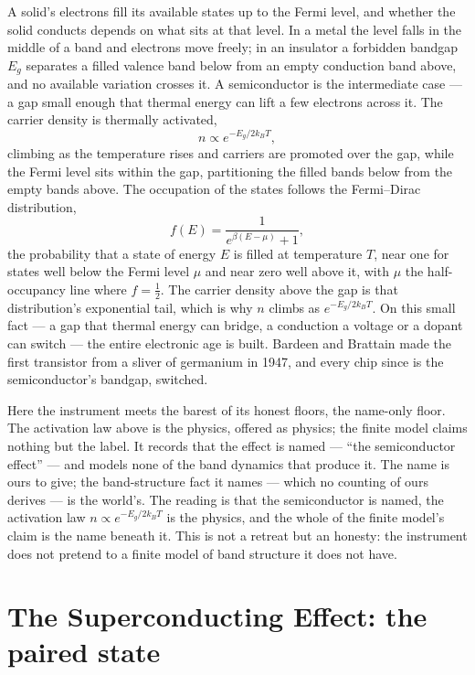 A solid's electrons fill its available states up to the Fermi level, and whether the solid conducts depends
on what sits at that level. In a metal the level falls in the middle of a band and electrons move freely; in
an insulator a forbidden bandgap $E_g$ separates a filled valence band below from an empty conduction band
above, and no available variation crosses it. A semiconductor is the intermediate case --- a gap small enough
that thermal energy can lift a few electrons across it. The carrier density is thermally activated,
\begin{equation}
  n \propto e^{-E_g/2k_B T},
\end{equation}
climbing as the temperature rises and carriers are promoted over the gap, while the Fermi level sits within
the gap, partitioning the filled bands below from the empty bands above. The occupation of the states follows
the Fermi--Dirac distribution,
\begin{equation}
  f(E) = \frac{1}{e^{\beta(E-\mu)} + 1},
\end{equation}
the probability that a state of energy $E$ is filled at temperature $T$, near one for states well below the
Fermi level $\mu$ and near zero well above it, with $\mu$ the half-occupancy line where $f = \tfrac12$. The
carrier density above the gap is that distribution's exponential tail, which is why $n$ climbs as $e^{-E_g/2k_B
T}$. On this small fact --- a gap that thermal energy can bridge, a conduction a voltage or a dopant can switch --- the entire electronic age is
built. Bardeen and Brattain made the first transistor from a sliver of germanium in 1947, and every chip since
is the semiconductor's bandgap, switched.

Here the instrument meets the barest of its honest floors, the name-only floor. The activation law above is
the physics, offered as physics; the finite model claims nothing but the label. It records that the effect is
named --- ``the semiconductor effect'' --- and models none of the band dynamics that produce it. The name is
ours to give; the band-structure fact it names --- which no counting of ours derives --- is the world's. The
reading is that the semiconductor is named, the activation law $n \propto e^{-E_g/2k_B T}$ is the physics, and
the whole of the finite model's claim is the name beneath it. This is not a retreat but an honesty: the
instrument does not pretend to a finite model of band structure it does not have.

\section{The Superconducting Effect: the paired state}
\label{se:superconducting}

